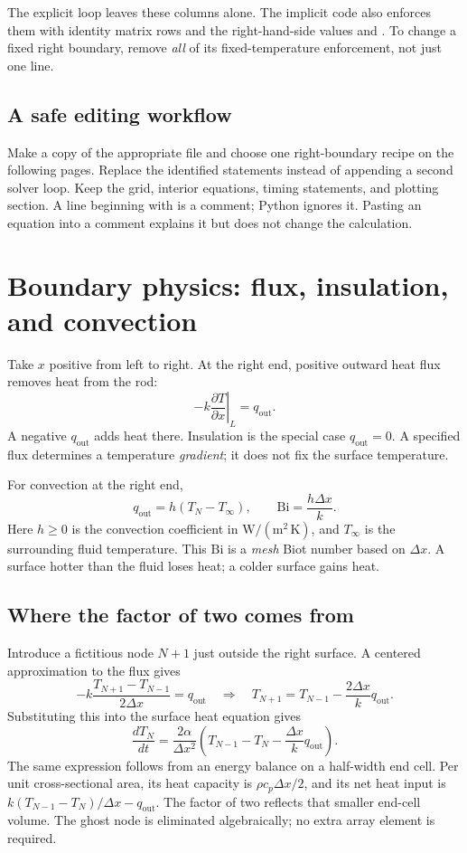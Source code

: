 \documentclass[11pt,letterpaper]{article}
\newcommand{\Bi}{\mathrm{Bi}}
\newcommand{\code}[1]{\texttt{\detokenize{#1}}}
\begin{document}
The explicit loop leaves these columns alone. The implicit code also
enforces them with identity matrix rows and the right-hand-side values
\code{b[0]} and \code{b[-1]}. To change a fixed right boundary, remove
\emph{all} of its fixed-temperature enforcement, not just one line.


\subsection*{A safe editing workflow}
Make a copy of the appropriate file and choose one right-boundary recipe
on the following pages. Replace the identified statements instead of
appending a second solver loop. Keep the grid, interior equations, timing
statements, and plotting section. A line beginning with \code{#} is a
comment; Python ignores it. Pasting an equation into a comment explains
it but does not change the calculation.


\section{Boundary physics: flux, insulation, and convection}
Take $x$ positive from left to right. At the right end, positive outward
heat flux removes heat from the rod:
\[
 -k\left.\frac{\partial T}{\partial x}\right|_L=q_{\mathrm{out}}.
\]
A negative $q_{\mathrm{out}}$ adds heat there. Insulation is the special
case $q_{\mathrm{out}}=0$. A specified flux determines a temperature
\emph{gradient}; it does not fix the surface temperature.


For convection at the right end,
\[
 q_{\mathrm{out}}=h(T_N-T_\infty),\qquad
 \Bi=\frac{h\Delta x}{k}.
\]
Here $h\ge0$ is the convection coefficient in $\mathrm{W/(m^2\,K)}$,
and $T_\infty$ is the surrounding fluid temperature. This $\Bi$ is a
\emph{mesh} Biot number based on $\Delta x$. A surface hotter than the
fluid loses heat; a colder surface gains heat.


\subsection*{Where the factor of two comes from}
Introduce a fictitious node $N+1$ just outside the right surface. A centered
approximation to the flux gives
\[
 -k\frac{T_{N+1}-T_{N-1}}{2\Delta x}=q_{\mathrm{out}}
 \quad\Longrightarrow\quad
 T_{N+1}=T_{N-1}-\frac{2\Delta x}{k}q_{\mathrm{out}}.
\]
Substituting this into the surface heat equation gives
\begin{equation}\label{eq:surface}
 \frac{dT_N}{dt}
 =\frac{2\alpha}{\Delta x^2}
 \left(T_{N-1}-T_N-\frac{\Delta x}{k}q_{\mathrm{out}}\right).
\end{equation}
The same expression follows from an energy balance on a half-width end
cell. Per unit cross-sectional area, its heat capacity is
$\rho c_p\Delta x/2$, and its net heat input is
$k(T_{N-1}-T_N)/\Delta x-q_{\mathrm{out}}$.
The factor of two reflects that smaller end-cell volume. The ghost node
is eliminated algebraically; no extra array element is required.
\end{document}
